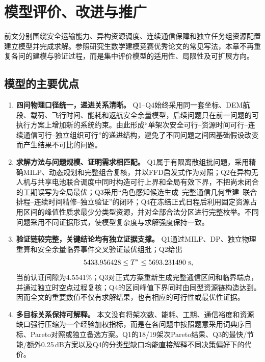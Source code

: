 \documentclass[UTF8,a4paper,12pt]{ctexart}
\begin{document}

\section{模型评价、改进与推广}
\label{sec:evaluation}

前文分别围绕安全运输能力、异构资源调度、连续通信保障和独立任务组资源配置建立模型并完成求解。参照研究生数学建模竞赛优秀论文的常见写法，本章不再重复各问的建模与验证过程，而是集中评价模型的适用性、局限性及可扩展方向。

\subsection{模型的主要优点}

\begin{enumerate}
\item \textbf{四问物理口径统一，递进关系清晰。}
Q1--Q4始终采用同一套坐标、DEM航段、载荷、飞行时间、能耗和返航安全余量模型，后续问题只在前一问题的可执行方案上增加新的系统约束。由此形成“单架次安全可行--资源时间可行--连续通信可行--独立组织可行”的递进结构，避免了不同问题之间因基础假设改变而产生结果不可比的问题。

\item \textbf{求解方法与问题规模、证明需求相匹配。}
Q1属于有限离散组批问题，采用精确MILP、动态规划和完整组合复核，并以FFD启发式作为对照；Q2在异构无人机与共享电池联合调度中同时构造可行上界和全局有效下界，不把尚未闭合的工期误写为全局最优；Q3采用“角色感知候选生成--完整通信几何重建--联合排程--连续时间精修--独立验证”的闭环；Q4在冻结正式日程后利用固定资源占用区间的峰值性质求最少分类型资源，并对全部合法分区进行完整枚举。不同问题采用不同证据形式，使模型复杂度与求解强度保持一致。

\item \textbf{验证链较完整，关键结论均有独立证据支撑。}
Q1通过MILP、DP、独立物理重算和安全余量临界事件交叉验证最优组批；Q2给出
\[
5433.956428\le T^*\le5693.231490\ {\rm s},
\]
当前认证间隙为4.5541\%；Q3对正式方案重新生成完整通信区间和临界端点，并通过独立时空点过程复核；Q4的区间峰值下界同时由同型资源链构造达到。因而全文的重要数值不仅有求解结果，也有相应的可行性或最优性证据。

\item \textbf{多目标关系保持可解释。}
本文没有将架次数、能耗、工期、通信裕度和资源缺口强行压缩为一个经验加权指标，而是在各问题中按照题意采用词典序目标、Pareto对照或独立备选方案。Q1的18/19架次Pareto结果、Q3的最快/节能/额外0.25\,dB方案以及Q4的分类型缺口均能直接解释不同决策偏好下的代价。
\end{enumerate}
\end{document}

